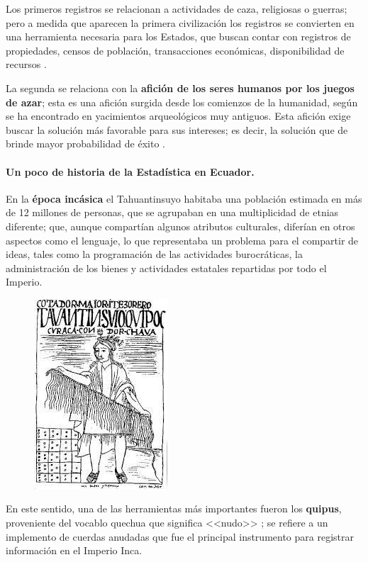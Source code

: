 \documentclass[a5paper,doc,10pt,noapacite]{apa6}
\begin{document}
{{Los primeros registros se relacionan a actividades de caza, religiosas o guerras; pero a medida que aparecen la primera civilización los registros se convierten en una herramienta necesaria para los Estados, que buscan contar con registros de propiedades, censos de población, transacciones
económicas, disponibilidad de recursos \cite{Fernandez-2002}.

La segunda se relaciona con la \textbf{afición de los seres humanos por los juegos de azar}; esta es una afición surgida desde los comienzos de la humanidad, según se ha encontrado en yacimientos arqueológicos muy antiguos. Esta afición exige buscar la solución más favorable para sus
intereses; es decir, la solución que de brinde mayor probabilidad de éxito \cite{Fernandez-2002}.

\paragraph{Un poco de historia de la Estadística en Ecuador.}

En la \textbf{época incásica} el Tahuantinsuyo habitaba una población estimada en más de 12 millones de personas, que se agrupaban en una multiplicidad de etnias diferente; que, aunque compartían algunos atributos culturales, diferían en otros aspectos como el lenguaje, lo que representaba un problema para el compartir de ideas, tales como la programación de las actividades burocráticas, la administración de los bienes y actividades estatales repartidas por todo el Imperio. 

\begin{figure} %
    \centering
    \includegraphics[scale=0.35]{Graficos/fig5_GC.jpg}
\end{figure}

En este sentido, una de las herramientas más importantes fueron los \textbf{quipus}, proveniente del vocablo quechua que significa <<nudo>> ; se refiere a un implemento de cuerdas anudadas que fue el principal instrumento para registrar información en el Imperio Inca.

}}
\end{document}
